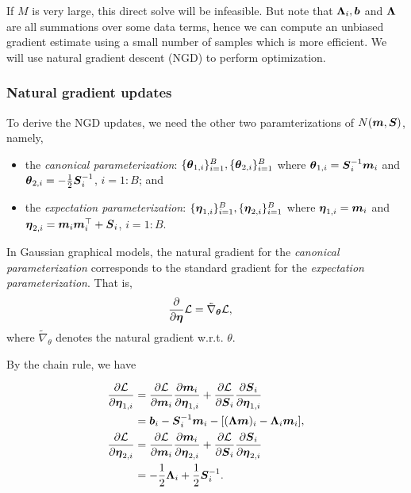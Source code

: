  If $M$ is very large, this direct solve will be infeasible.
But note that ${\boldsymbol{\Lambda}}_i, \boldsymbol{b}$ and ${\boldsymbol{\Lambda}}$ are all summations over some data terms,
hence we can compute an unbiased gradient estimate using a small number of samples which is more efficient. We will use natural gradient descent (NGD) to perform optimization. 

\subsubsection{Natural gradient updates}
To derive the NGD updates, we need the other two paramterizations of $N(\boldsymbol{m}, \boldsymbol{S})$, namely,
\begin{itemize}
  \item the \textit{canonical parameterization}: $ \{{\boldsymbol{\theta}}_{1, i}\}_{i=1}^B, \{{\boldsymbol{\theta}}_{2,i} \}_{i=1}^B$
  where ${\boldsymbol{\theta}}_{1,i}= \boldsymbol{S}_i^{-1} \boldsymbol{m}_i$ and ${\boldsymbol{\theta}}_{2,i} = -\frac{1}{2} \boldsymbol{S}_i^{-1}$, $i=1:B$; and
  \item the \textit{expectation parameterization}: $\{\boldsymbol{\eta}_{1,i} \}_{i=1}^B, \{\boldsymbol{\eta}_{2,i} \}_{i=1}^B$
  where $\boldsymbol{\eta}_{1,i} = \boldsymbol{m}_i$ and $\boldsymbol{\eta}_{2,i} = \boldsymbol{m}_i \boldsymbol{m}_i^\top + \boldsymbol{S}_i$, $i=1:B$.
\end{itemize}

In Gaussian graphical models, the natural gradient for the \textit{canonical parameterization} corresponds to
the standard gradient for the \textit{expectation parameterization}. That is,
\begin{align}
  \frac{\partial}{\partial \boldsymbol{\eta}} \mathcal{L} &= \tilde{\nabla}_{{\boldsymbol{\theta}}} \mathcal{L},
\end{align}
where $\tilde{\nabla}_\theta$ denotes the natural gradient w.r.t. $\theta$.

By the chain rule, we have

\begin{align}
  \frac{\partial \mathcal{L}}{ \partial \boldsymbol{\eta}_{1,i}}
&= \frac{\partial \mathcal{L}}{\partial{\boldsymbol{m}_i}} \frac{\partial \boldsymbol{m}_i}{\partial \boldsymbol{\eta}_{1,i}}
  + \frac{\partial \mathcal{L}}{\partial \boldsymbol{S}_i}\frac{\partial \boldsymbol{S}_i}{ \partial \boldsymbol{\eta}_{1,i}} \\
&= \boldsymbol{b}_i -\boldsymbol{S}_i^{-1}\boldsymbol{m}_i - [({\boldsymbol{\Lambda}} \boldsymbol{m} )_i - {\boldsymbol{\Lambda}}_i \boldsymbol{m}_i ], \\
\frac{\partial \mathcal{L}}{\partial \boldsymbol{\eta}_{2,i}}
&= \frac{\partial \mathcal{L}}{\partial{\boldsymbol{m}_i}} \frac{\partial \boldsymbol{m}_i}{\partial \boldsymbol{\eta}_{2,i}}
   + \frac{\partial \mathcal{L}}{\partial \boldsymbol{S}_i}\frac{\partial \boldsymbol{S}_i}{ \partial \boldsymbol{\eta}_{2,i}} \\
&= -\frac{1}{2}{\boldsymbol{\Lambda}}_i + \frac{1}{2}\boldsymbol{S}_i^{-1}.
\end{align}

